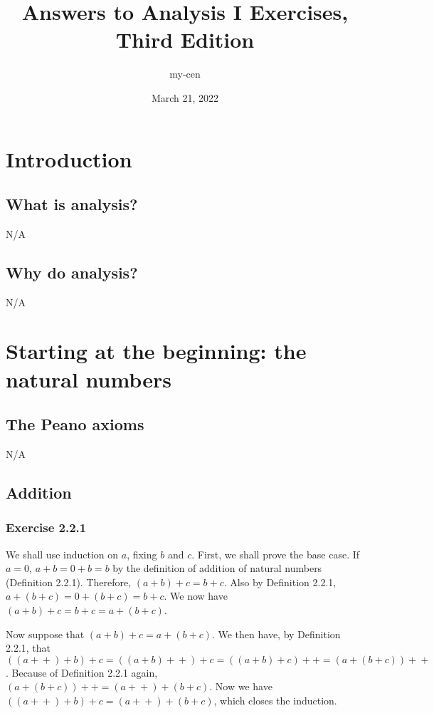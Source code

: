\documentclass[12pt, oneside]{book}
\newcommand{\increment}{\! + \! +}
\begin{document}
	\title{Answers to Analysis I Exercises, Third Edition}
	\author{my-cen}
	\date{March 21, 2022}
	\maketitle
	\tableofcontents
	
	\chapter{Introduction}
	
	\section{What is analysis?}
	
	N/A
	
	\section{Why do analysis?}
	
	N/A
	
	\chapter{Starting at the beginning: the natural numbers}
	
	\section{The Peano axioms}
	
	N/A
	
	\section{Addition}
	
	\subsection*{Exercise 2.2.1}
	
	We shall use induction on $a$, fixing $b$ and $c$. First, we shall prove the base case. If $a = 0$, $a + b = 0 + b = b$ by the definition of addition of natural numbers  (Definition 2.2.1). Therefore, $(a + b) + c = b + c$. Also by Definition 2.2.1, $a + (b + c) = 0 + (b + c) = b + c$. We now have $(a + b) + c = b + c = a + (b + c)$.
	
	Now suppose that $(a + b) + c = a + (b + c)$. We then have, by Definition 2.2.1, that $((a\increment) + b) + c = ((a + b)\increment) + c = ((a + b) + c)\increment = (a + (b + c))\increment$. Because of Definition 2.2.1 again, $(a + (b + c))\increment = (a\increment) + (b + c)$. Now we have $((a\increment) + b) + c = (a\increment) + (b + c)$, which closes the induction.
	
\end{document}

